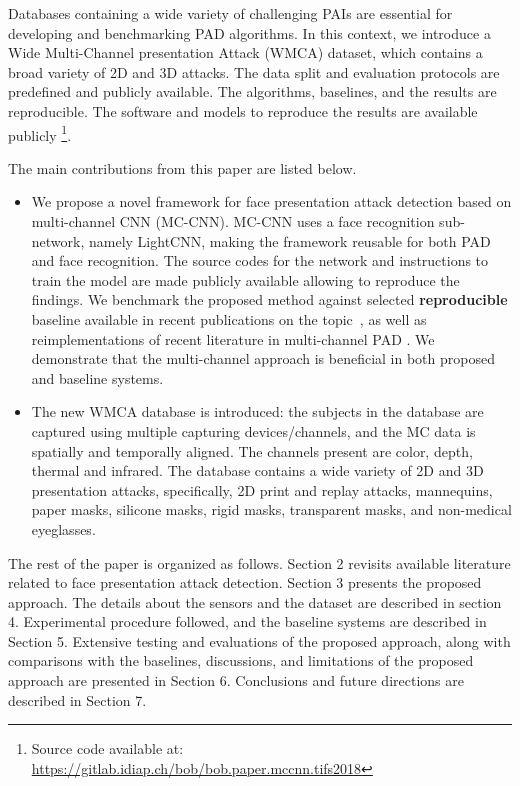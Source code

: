 \documentclass[journal]{IEEEtran}
\begin{document}
Databases containing a wide variety of challenging PAIs are essential for developing and benchmarking PAD algorithms. In this context, we introduce a Wide Multi-Channel presentation Attack (WMCA) dataset, which contains a broad variety of 2D and 3D attacks. The data split and evaluation protocols are predefined and publicly available. The algorithms, baselines, and the results are reproducible. The software and models to reproduce the results are available publicly \footnote{Source code available at: \url{https://gitlab.idiap.ch/bob/bob.paper.mccnn.tifs2018}}.

The main contributions from this paper are listed below.

\begin{itemize}

\item We propose a novel framework for face presentation attack detection based on multi-channel CNN (MC-CNN). MC-CNN uses a face recognition sub-network, namely LightCNN, making the framework reusable for both PAD and face recognition. The source codes for the network and instructions to train the model are made publicly available allowing to reproduce the findings. We benchmark the proposed method against selected \textbf{reproducible} baseline available in recent publications on the topic~\cite{nikisins2018effectiveness}, as well as reimplementations of recent literature in multi-channel PAD \cite{lucena2017transfer}. We demonstrate that the multi-channel approach is beneficial in both proposed and baseline systems.
\item The new WMCA database is introduced: the subjects in the database are captured using multiple capturing devices/channels, and the MC data is spatially and temporally aligned. The channels present are color, depth, thermal and infrared. The database contains a wide variety of 2D and 3D presentation attacks, specifically, 2D print and replay attacks, mannequins, paper masks, silicone masks, rigid masks, transparent masks, and non-medical eyeglasses.
\end{itemize}


The rest of the paper is organized as follows. Section 2 revisits available literature related to face presentation attack detection. Section 3 presents the proposed approach. The details about the sensors and the dataset are described in section 4. Experimental procedure followed, and the baseline systems are described in Section 5. Extensive testing and evaluations of the proposed approach, along with comparisons with the baselines, discussions, and limitations of the proposed approach are presented in Section 6. Conclusions and future directions are described in Section 7.
\end{document}
